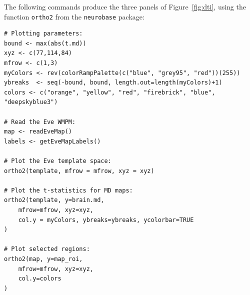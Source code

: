 \documentclass[]{elsarticle} %
\begin{document}
The following commands produce the three panels of Figure~\ref{fig:dti}, using the function \texttt{ortho2} from the \texttt{neurobase} package:
\color{blue}
\begin{verbatim}
# Plotting parameters:
bound <- max(abs(t.md))
xyz <- c(77,114,84)
mfrow <- c(1,3)
myColors <- rev(colorRampPalette(c("blue", "grey95", "red"))(255))
ybreaks  <- seq(-bound, bound, length.out=length(myColors)+1)
colors <- c("orange", "yellow", "red", "firebrick", "blue", "deepskyblue3")

# Read the Eve WMPM:
map <- readEveMap()
labels <- getEveMapLabels()

# Plot the Eve template space:
ortho2(template, mfrow = mfrow, xyz = xyz)

# Plot the t-statistics for MD maps:
ortho2(template, y=brain.md, 
    mfrow=mfrow, xyz=xyz, 
    col.y = myColors, ybreaks=ybreaks, ycolorbar=TRUE
)

# Plot selected regions:
ortho2(map, y=map_roi, 
    mfrow=mfrow, xyz=xyz, 
    col.y=colors
)
\end{verbatim}
\color{black}
\end{document}
